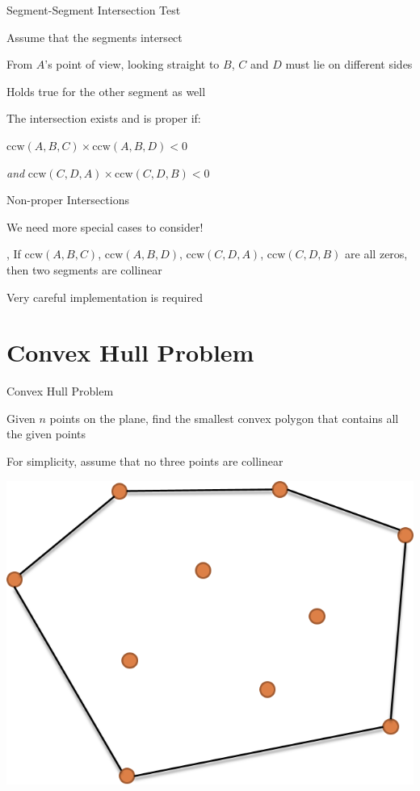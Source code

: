 \documentclass[13pt,onlymath]{beamer}
\begin{document}
\begin{frame}{Segment-Segment Intersection Test}
\BIT
\item Assume that the segments intersect
\BIT
\item From $A$'s point of view, looking straight to $B$, $C$ and $D$ must lie on different sides
\item Holds true for the other segment as well
\EIT
\item The intersection exists and is proper if:
\BIT
\item $\mathrm{ccw}(A, B, C) \times \mathrm{ccw}(A, B, D) < 0$
\item \emph{and} $\mathrm{ccw}(C, D, A) \times \mathrm{ccw}(C, D, B) < 0$
\EIT\EIT
\end{frame}

\begin{frame}{Non-proper Intersections}
\BIT
\item We need more special cases to consider!
\item \eg, If $\mathrm{ccw}(A, B, C)$, $\mathrm{ccw}(A, B, D)$, $\mathrm{ccw}(C, D, A)$, $\mathrm{ccw}(C, D, B)$ are all zeros, then two segments are collinear
\item Very careful implementation is required
\EIT
\end{frame}

\section{Convex Hull Problem}

\begin{frame}{Convex Hull Problem}
\BIT
\item Given $n$ points on the plane, find the smallest convex polygon that contains all the given points
\BIT
\item For simplicity, assume that no three points are collinear
\EIT\EIT
\begin{center}
\includegraphics[height=0.5\textheight]{figures/convhull}
\end{center}
\end{frame}
\end{document}
